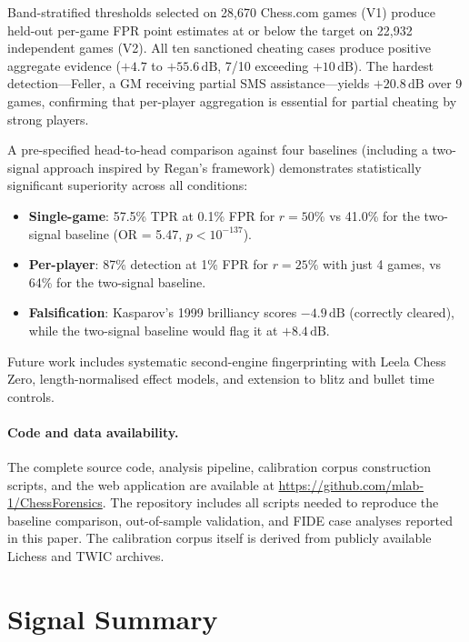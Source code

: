 \documentclass[11pt,a4paper]{article}
\newcommand{\dB}{\,\mathrm{dB}}
\theoremstyle{definition}
\begin{document}
Band-stratified thresholds selected on 28{,}670 Chess.com games (V1)
produce held-out per-game FPR point estimates at or below the target
on 22{,}932 independent games (V2).
All ten sanctioned cheating cases produce positive aggregate
evidence ($+4.7$ to $+55.6\dB$, 7/10 exceeding $+10\dB$).  The
hardest detection---Feller, a GM receiving partial SMS
assistance---yields $+20.8\dB$ over 9 games, confirming that
per-player aggregation is essential for partial cheating by strong
players.

A pre-specified head-to-head comparison against four baselines
(including a two-signal approach inspired by Regan's framework)
demonstrates statistically significant superiority across all
conditions:
\begin{itemize}[nosep]
  \item \textbf{Single-game}: 57.5\% TPR at 0.1\% FPR for
    $r = 50\%$ vs 41.0\% for the two-signal baseline
    (OR = 5.47, $p < 10^{-137}$).
  \item \textbf{Per-player}: 87\% detection at 1\% FPR for
    $r = 25\%$ with just 4 games, vs 64\% for the two-signal baseline.
  \item \textbf{Falsification}: Kasparov's 1999 brilliancy scores
    $-4.9\dB$ (correctly cleared), while the two-signal baseline
    would flag it at $+8.4\dB$.
\end{itemize}

Future work includes systematic second-engine fingerprinting with
Leela Chess Zero, length-normalised effect models, and extension
to blitz and bullet time controls.

\paragraph{Code and data availability.}
The complete source code, analysis pipeline, calibration corpus construction
scripts, and the web application are available at
\url{https://github.com/mlab-1/ChessForensics}.
The repository includes all scripts needed to reproduce the baseline
comparison, out-of-sample validation, and FIDE case analyses reported
in this paper.  The calibration corpus itself is derived from publicly
available Lichess and TWIC archives.


\appendix
\section{Signal Summary}
\label{app:signals}
\end{document}
